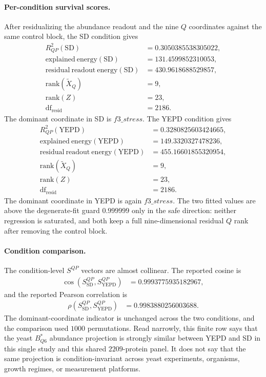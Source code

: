 \paragraph{Per-condition survival scores.}
After residualizing the abundance readout and the nine $Q$ coordinates against the same control block, the SD condition gives
$$
\begin{aligned}
R^2_{QP}(\mathrm{SD}) &= 0.3050385538305022,\\
\mathrm{explained\ energy}(\mathrm{SD}) &= 131.4599852310053,\\
\mathrm{residual\ readout\ energy}(\mathrm{SD}) &= 430.9618688529857,\\
\mathrm{rank}(\widetilde X_{Q}) &= 9,\\
\mathrm{rank}(Z) &= 23,\\
\mathrm{df}_{\mathrm{resid}} &= 2186.
\end{aligned}
$$
The dominant coordinate in SD is $f3\_stress$.  The YEPD condition gives
$$
\begin{aligned}
R^2_{QP}(\mathrm{YEPD}) &= 0.3280825603424665,\\
\mathrm{explained\ energy}(\mathrm{YEPD}) &= 149.3320327478236,\\
\mathrm{residual\ readout\ energy}(\mathrm{YEPD}) &= 455.16601855320954,\\
\mathrm{rank}(\widetilde X_{Q}) &= 9,\\
\mathrm{rank}(Z) &= 23,\\
\mathrm{df}_{\mathrm{resid}} &= 2186.
\end{aligned}
$$
The dominant coordinate in YEPD is again $f3\_stress$.  The two fitted values are above the degenerate-fit guard $0.999999$ only in the safe direction: neither regression is saturated, and both keep a full nine-dimensional residual $Q$ rank after removing the control block.

\paragraph{Condition comparison.}
The condition-level $S^{QP}$ vectors are almost collinear.  The reported cosine is
$$
\begin{aligned}
\cos(S^{QP}_{\mathrm{SD}},S^{QP}_{\mathrm{YEPD}}) &= 0.9993775935182967,
\end{aligned}
$$
and the reported Pearson correlation is
$$
\begin{aligned}
\rho(S^{QP}_{\mathrm{SD}},S^{QP}_{\mathrm{YEPD}}) &= 0.9983880256003688.
\end{aligned}
$$
The dominant-coordinate indicator is unchanged across the two conditions, and the comparison used $1000$ permutations.  Read narrowly, this finite row says that the yeast $B^{\ast}_{Q6}$ abundance projection is strongly similar between YEPD and SD in this single study and this shared $2209$-protein panel.  It does not say that the same projection is condition-invariant across yeast experiments, organisms, growth regimes, or measurement platforms.

